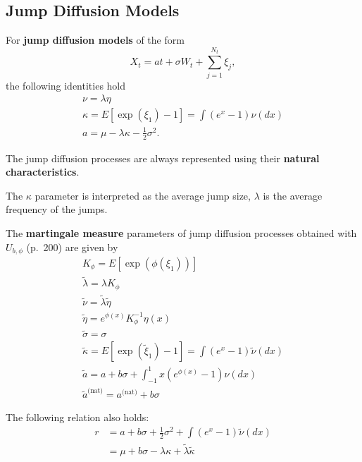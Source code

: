 \documentclass[10pt]{article}
\begin{document}
\subsection{Jump Diffusion Models}
\begin{outline}
  \1 For \textbf{jump diffusion models} of the form
  \begin{equation*}
    X_t = at + \sigma W_t + \sum_{j=1}^{N_t}\xi_j,
  \end{equation*}
  the following identities hold
  \begin{gather*}
    \nu = \lambda\eta\\
    \kappa = E[\exp(\xi_1)-1] = \int(e^x-1)\nu(dx)\\
    a = \mu -\lambda\kappa -\tfrac{1}{2}\sigma^2.
  \end{gather*}

  \1 The jump diffusion processes are always represented using their \textbf{natural
    characteristics}.

  \1 The $\kappa$ parameter is interpreted as the average jump size, $\lambda$ is the
  average frequency of the jumps.

  \1 The \textbf{martingale measure} parameters of jump diffusion processes obtained with
  $U_{b,\phi}$ (p.~200) are given by
  \begin{gather*}
    K_\phi = E[\exp(\phi(\xi_1))]\\
    \tilde\lambda = \lambda K_\phi\\
    \tilde\nu = \tilde\lambda\tilde\eta\\
    \tilde\eta = e^{\phi(x)}K_\phi^{-1}\eta(x)\\
    \tilde\sigma = \sigma\\
    \tilde\kappa = E[\exp(\tilde\xi_1)-1] = \int(e^x-1)\tilde\nu(dx)\\
    \tilde a = a + b\sigma +\int_{-1}^1x(e^{\phi(x)}-1)\nu(dx)\\
    \tilde a^{\text{(nat)}} = a^{\text{(nat)}} + b\sigma
  \end{gather*}

  \1 The following relation also holds:
  \begin{align*}
    r &= a + b\sigma + \tfrac{1}{2}\sigma^2 + \int(e^x-1)\tilde\nu(dx)\\
      &= \mu + b\sigma - \lambda\kappa + \tilde\lambda\tilde\kappa
  \end{align*}
\end{outline}
\end{document}
